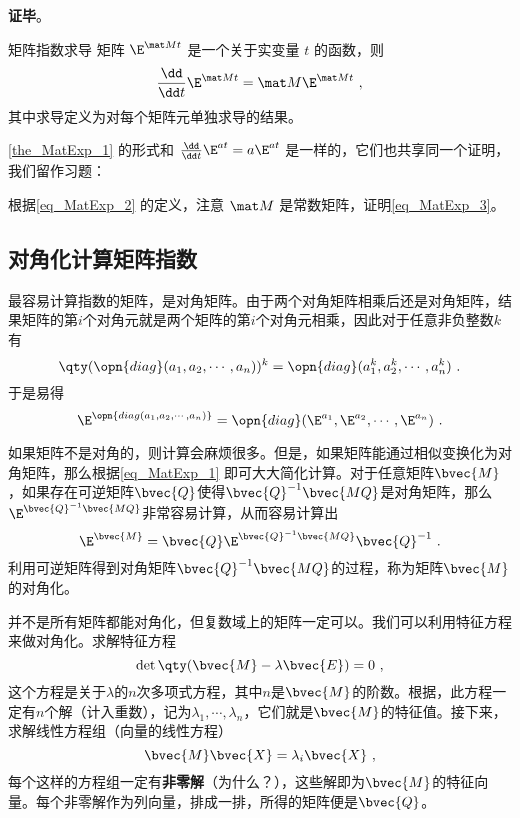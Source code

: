 \textbf{证毕}。





\begin{theorem}{矩阵指数求导}\label{the_MatExp_1}
矩阵 $\E^{\mat Mt}$ 是一个关于实变量 $t$ 的函数，则
\begin{equation}\label{eq_MatExp_3}
\frac{\dd}{\dd t}\E^{\mat Mt}=\mat M\E^{\mat Mt}~,
\end{equation}
其中求导定义为对每个矩阵元单独求导的结果。
\end{theorem}

\autoref{the_MatExp_1} 的形式和 $\frac{\dd}{\dd t}\E^{at}=a\E^{at}$ 是一样的，它们也共享同一个证明，我们留作习题：

\begin{exercise}{}
根据\autoref{eq_MatExp_2} 的定义，注意 $\mat M$ 是常数矩阵，证明\autoref{eq_MatExp_3}。
\end{exercise}





\subsection{对角化计算矩阵指数}



最容易计算指数的矩阵，是对角矩阵。由于两个对角矩阵相乘后还是对角矩阵，结果矩阵的第$i$个对角元就是两个矩阵的第$i$个对角元相乘，因此对于任意非负整数$k$有
\begin{equation}
\qty(\opn{diag}(a_1, a_2, \cdots, a_n))^k = \opn{diag}(a_1^k, a_2^k, \cdots, a_n^k)~. 
\end{equation}
于是易得
\begin{equation}
\E^{\opn{diag(a_1, a_2, \cdots, a_n)}} = \opn{diag}(\E^{a_1}, \E^{a_2}, \cdots, \E^{a_n})~. 
\end{equation}


如果矩阵不是对角的，则计算会麻烦很多。但是，如果矩阵能通过相似变换化为对角矩阵，那么根据\autoref{eq_MatExp_1} 即可大大简化计算。对于任意矩阵$\bvec{M}$，如果存在可逆矩阵$\bvec{Q}$使得$\bvec{Q}^{-1}\bvec{MQ}$是对角矩阵，那么$\E^{\bvec{Q}^{-1}\bvec{MQ}}$非常容易计算，从而容易计算出
\begin{equation}
\E^{\bvec{M}} = \bvec{Q}\E^{\bvec{Q}^{-1}\bvec{MQ}}\bvec{Q}^{-1}~. 
\end{equation}
利用可逆矩阵得到对角矩阵$\bvec{Q}^{-1}\bvec{MQ}$的过程，称为矩阵$\bvec{M}$的对角化。

并不是所有矩阵都能对角化，但复数域上的矩阵一定可以。我们可以利用特征方程来做对角化。求解特征方程
\begin{equation}
\det\qty(\bvec{M}-\lambda\bvec{E})=0~, 
\end{equation}
这个方程是关于$\lambda$的$n$次多项式方程，其中$n$是$\bvec{M}$的阶数。根据，此方程一定有$n$个解（计入重数），记为$\lambda_1, \cdots, \lambda_n$，它们就是$\bvec{M}$的特征值。接下来，求解线性方程组（向量的线性方程）
\begin{equation}
\bvec{M}\bvec{X} = \lambda_i\bvec{X}~, 
\end{equation}
每个这样的方程组一定有\textbf{非零解}（为什么？），这些解即为$\bvec{M}$的特征向量。每个非零解作为列向量，排成一排，所得的矩阵便是$\bvec{Q}$。


